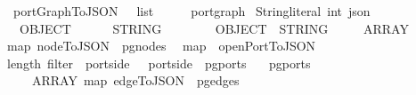 \ portGraphToJSON\ {\isacharcolon}{\isacharcolon}\ {\isachardoublequoteopen}\ list\ {\isasymRightarrow}\ {\isacharparenleft}\ \ \ \ port{\isacharunderscore}graph\isanewline
{}\ {\isacharparenleft}String{\isachardot}literal{\isacharcomma}\ int{\isacharparenright}\ json{\isachardoublequoteclose}\isanewline
\ \ \ {\isachardoublequoteopen}\ \ {\isacharequal}\isanewline
\ \ OBJECT\ {\isacharbrackleft}\isanewline
\ \ \ \ {\isacharparenleft}\ STRING\ {\isacharparenleft}\ \ {\isacharplus}\ \isanewline
\ \ {\isacharcomma}\ {\isacharparenleft}\ OBJECT\ {\isacharbrackleft}{\isacharparenleft}\ STRING\ \isanewline
\ \ {\isacharcomma}\ {\isacharparenleft}\ ARRAY\ {\isacharparenleft}\isanewline
{}map\ {\isacharparenleft}nodeToJSON\ \ {\isacharparenleft}pg{\isacharunderscore}nodes\ \ {\isacharat}\isanewline
{}map\ {\isacharparenleft}{\isasymlambda}\ openPortToJSON\isanewline
{}length\ {\isacharparenleft}filter\ {\isacharparenleft}{\isasymlambda}\ port{\isachardot}side\ \ {\isacharequal}\ port{\isachardot}side\ \ {\isacharparenleft}pg{\isacharunderscore}ports\ \ {\isacharminus}\ {}{\isacharparenright}\isanewline
{}\isanewline
{}pg{\isacharunderscore}ports\ \isanewline
\ \ {\isacharcomma}\ {\isacharparenleft}\ ARRAY\ {\isacharparenleft}map\ {\isacharparenleft}edgeToJSON\ \ {\isacharparenleft}pg{\isacharunderscore}edges\ 
